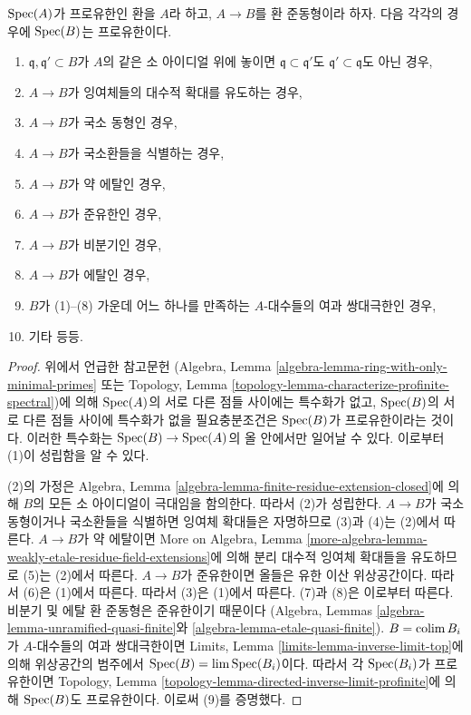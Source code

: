 \begin{lemma}
\label{lemma-profinite-goes-up}
$\mathop{\mathrm{Spec}}(A)$가 프로유한인 환을 $A$라 하고, $A \to B$를 환 준동형이라 하자.
다음 각각의 경우에 $\mathop{\mathrm{Spec}}(B)$는 프로유한이다.
\begin{enumerate}
\item $\mathfrak q,\mathfrak q' \subset B$가 $A$의 같은 소 아이디얼 위에 놓이면
$\mathfrak q \subset \mathfrak q'$도 $\mathfrak q' \subset \mathfrak q$도 아닌 경우,
\item $A \to B$가 잉여체들의 대수적 확대를 유도하는 경우,
\item $A \to B$가 국소 동형인 경우,
\item $A \to B$가 국소환들을 식별하는 경우,
\item $A \to B$가 약 에탈인 경우,
\item $A \to B$가 준유한인 경우,
\item $A \to B$가 비분기인 경우,
\item $A \to B$가 에탈인 경우,
\item $B$가 (1)--(8) 가운데 어느 하나를 만족하는 $A$-대수들의
여과 쌍대극한인 경우,
\item 기타 등등.
\end{enumerate}
\end{lemma}

\begin{proof}
위에서 언급한 참고문헌
(Algebra, Lemma \ref{algebra-lemma-ring-with-only-minimal-primes} 또는
Topology, Lemma \ref{topology-lemma-characterize-profinite-spectral})에 의해
$\mathop{\mathrm{Spec}}(A)$의 서로 다른 점들 사이에는 특수화가 없고,
$\mathop{\mathrm{Spec}}(B)$의 서로 다른 점들 사이에 특수화가 없을 필요충분조건은
$\mathop{\mathrm{Spec}}(B)$가 프로유한이라는 것이다.
이러한 특수화는 $\mathop{\mathrm{Spec}}(B) \to \mathop{\mathrm{Spec}}(A)$의 올 안에서만 일어날 수 있다.
이로부터 (1)이 성립함을 알 수 있다.

\medskip\noindent
(2)의 가정은 Algebra, Lemma
\ref{algebra-lemma-finite-residue-extension-closed}에 의해
$B$의 모든 소 아이디얼이 극대임을 함의한다. 따라서 (2)가 성립한다.
$A \to B$가 국소 동형이거나 국소환들을 식별하면 잉여체 확대들은
자명하므로 (3)과 (4)는 (2)에서 따른다.
$A \to B$가 약 에탈이면 More on Algebra, Lemma
\ref{more-algebra-lemma-weakly-etale-residue-field-extensions}에 의해
분리 대수적 잉여체 확대들을 유도하므로 (5)는 (2)에서 따른다.
$A \to B$가 준유한이면 올들은 유한 이산 위상공간이다.
따라서 (6)은 (1)에서 따른다.
따라서 (3)은 (1)에서 따른다. (7)과 (8)은 이로부터 따른다.
비분기 및 에탈 환 준동형은 준유한이기 때문이다
(Algebra, Lemmas
\ref{algebra-lemma-unramified-quasi-finite}와
\ref{algebra-lemma-etale-quasi-finite}).
$B = \mathop{\mathrm{colim}}\nolimits B_i$가 $A$-대수들의 여과 쌍대극한이면
Limits, Lemma \ref{limits-lemma-inverse-limit-top}에 의해
위상공간의 범주에서 $\mathop{\mathrm{Spec}}(B) = \mathop{\mathrm{lim}}\nolimits \mathop{\mathrm{Spec}}(B_i)$이다.
따라서 각 $\mathop{\mathrm{Spec}}(B_i)$가 프로유한이면
Topology, Lemma \ref{topology-lemma-directed-inverse-limit-profinite}에 의해
$\mathop{\mathrm{Spec}}(B)$도 프로유한이다. 이로써 (9)를 증명했다.
\end{proof}


